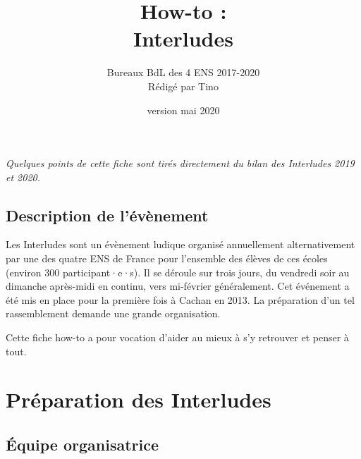  
\usepackage{multirow}
\usepackage{stmaryrd}

\usepackage{manfnt}
\usepackage{accents}

\usepackage[normalem]{ulem} %

\usepackage{color}
\newcommand{\Tino}[1]{\textit{\textcolor{teal}{[Tino]: #1}}}

\title{How-to :\texorpdfstring{\\}{, } Interludes}
\date{version mai 2020}
\author{Bureaux BdL des 4 ENS 2017-2020\\
Rédigé par Tino}


\maketitle

\tableofcontents\bigskip

\textit{Quelques points de cette fiche sont tirés directement du bilan des Interludes 2019 et 2020.}

\subsection*{Description de l'évènement}

Les Interludes sont un évènement ludique organisé annuellement alternativement par une des quatre ENS de France pour
l’ensemble des élèves de ces écoles (environ 300 participant·e·s). Il se déroule sur trois jours, du vendredi soir au dimanche après-midi en continu, vers mi-février généralement. Cet événement a été mis en place pour la première fois à Cachan en 2013. La préparation d'un tel rassemblement demande une grande organisation.

Cette fiche how-to a pour vocation d'aider au mieux à s'y retrouver et penser à tout.

\section{Préparation des Interludes}

\subsection{Équipe organisatrice}\label{sec:equipe}

